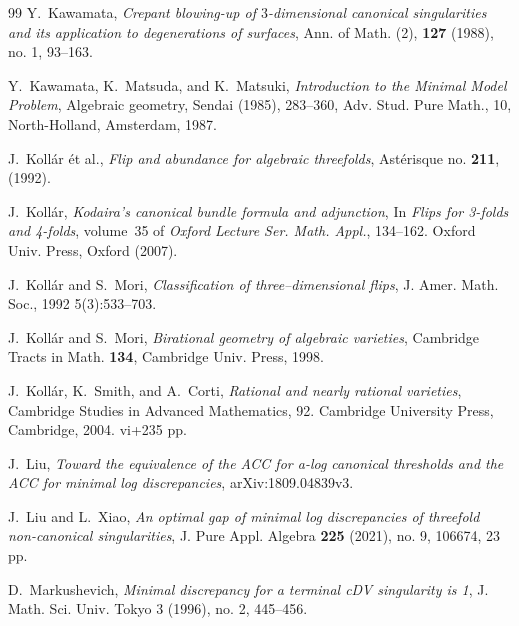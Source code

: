 \documentclass[11pt]{amsart}
\numberwithin{equation}{section}
\theoremstyle{definition}
\theoremstyle{definition}
\begin{document}
\begin{thebibliography}{99}
 Y.~Kawamata, \textit{Crepant blowing-up of $3$-dimensional canonical singularities and its application to degenerations of surfaces}, Ann. of Math. (2), \textbf{127} (1988), no. 1, 93--163.

	

 Y.~Kawamata, K.~Matsuda, and K.~Matsuki, \textit{Introduction to the Minimal Model Problem}, Algebraic geometry, Sendai (1985), 283--360, Adv. Stud. Pure Math., 10, North-Holland, Amsterdam, 1987.		
					


 J.~Koll\'{a}r \'{e}t al., \textit{Flip and abundance for algebraic threefolds}, Ast\'{e}risque no. \textbf{211}, (1992).

 J.~Koll\'ar,  \textit{Kodaira's canonical bundle formula and adjunction}, \newblock In {\em Flips for 3-folds and 4-folds}, volume~35 of {\em Oxford Lecture Ser. Math. Appl.}, 134--162. Oxford Univ. Press, Oxford (2007).

 J.~Koll\'{a}r and S.~Mori, \textit{Classification of three--dimensional flips}, J. Amer. Math. Soc., 1992 5(3):533--703.

 J.~Koll\'{a}r and S.~Mori, \textit{Birational geometry of algebraic varieties}, Cambridge Tracts in Math. \textbf{134}, Cambridge Univ. Press, 1998.

 J.~Koll\'{a}r, K.~Smith, and A.~Corti, \textit{Rational and nearly rational varieties}, Cambridge Studies in Advanced Mathematics, 92. Cambridge University Press, Cambridge, 2004. vi+235 pp.

 J.~Liu, \textit{Toward the equivalence of the ACC for a-log canonical thresholds and the ACC for minimal log discrepancies}, arXiv:1809.04839v3.

 J.~Liu and L.~Xiao, \textit{An optimal gap of minimal log discrepancies of threefold non-canonical singularities}, J. Pure Appl. Algebra \textbf{225} (2021), no. 9, 106674, 23 pp.

 D.~Markushevich, \textit{Minimal discrepancy for a terminal cDV singularity is 1}, J. Math. Sci. Univ. Tokyo 3
(1996), no. 2, 445–456.


\end{thebibliography}
\end{document}
